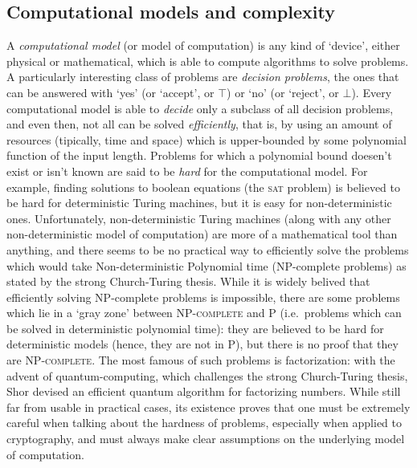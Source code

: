\subsection{Computational models and complexity}
A \emph{computational model} (or model of computation) is any kind of `device', either physical or
mathematical, which is able to compute algorithms to solve problems.
A particularly interesting class of problems are \emph{decision problems}, the ones that can be
answered with `yes' (or `accept', or \(\top \)) or `no' (or `reject', or \(\bot \)).
Every computational model is able to \emph{decide} only a subclass of all decision problems, and
even then, not all can be solved \emph{efficiently}, that is, by using an amount of resources
(tipically, time and space) which is upper-bounded by some polynomial function of the input length.
Problems for which a polynomial bound doesen't exist or isn't known are said to be \emph{hard} for
the computational model.
For example, finding solutions to boolean equations (the \textsc{sat} problem) is believed to be
hard for deterministic Turing machines, but it is easy for non-deterministic ones.
Unfortunately, non-deterministic Turing machines (along with any other non-deterministic model of
computation) are more of a mathematical tool than anything, and there seems to be no practical way
to efficiently solve the problems which would take Non-deterministic Polynomial time (NP-complete 
problems) as stated by the strong Church-Turing thesis.
While it is widely belived that efficiently solving NP-complete problems is impossible, there are 
some problems which lie in a `gray zone' between \textsc{NP-complete} and \textsc{P} (i.e.\ 
problems which can be solved in deterministic polynomial time): they are believed to be hard for 
deterministic models (hence, they are not in \textsc{P}), but there is no proof that they are 
\textsc{NP-complete}.
The most famous of such problems is factorization: with the advent of quantum-computing, 
which challenges the strong Church-Turing thesis, Shor devised an efficient quantum algorithm 
for factorizing numbers.
While still far from usable in practical cases, its existence proves that one must be extremely
careful when talking about the hardness of problems, especially when applied to cryptography, 
and must always make clear assumptions on the underlying model of computation.
